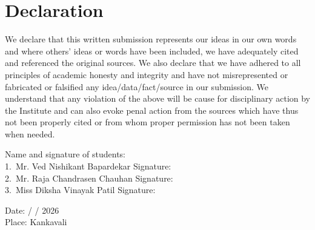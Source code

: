 \chapter*{Declaration}

\hspace*{2cm} We declare that this written submission represents our ideas in our own words and where others' ideas or words have been included, we have adequately cited and referenced the original sources. We also declare that we have adhered to all principles of academic honesty and integrity and have not misrepresented or fabricated or falsified any idea/data/fact/source in our submission. We understand that any violation of the above will be cause for disciplinary action by the Institute and can also evoke penal action from the sources which have thus not been properly cited or from whom proper permission has not been taken when needed.\\

\begin{flushleft}
Name and signature of students:\\
\vspace{0.5cm}
1.\ Mr. Ved Nishikant Bapardekar \hspace{1cm} Signature: \underline{\hspace{3cm}}
\\
\vspace{0.5cm}
2.\ Mr. Raja Chandrasen Chauhan \hspace{1cm} Signature: \underline{\hspace{3cm}}
\\
\vspace{0.5cm}
3.\ Miss Diksha Vinayak Patil \hspace{2.65cm} Signature: \underline{\hspace{3cm}}
\\
\vspace{0.5cm}
\end{flushleft}
Date: \hspace{0.3cm} / \hspace{0.3cm} / 2026 \\
Place: Kankavali\\
